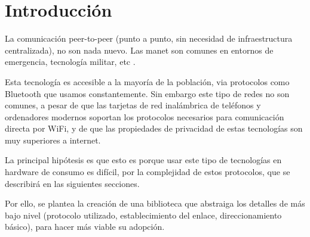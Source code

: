 \chapter{Introducción}

La comunicación peer-to-peer (punto a punto, sin necesidad de infraestructura
centralizada), no son nada nuevo. Las \gls{manet} son comunes en entornos de
emergencia, tecnología militar, etc \cite{wiki:manet_applications}.

Esta tecnología es accesible a la mayoría de la población, via protocolos como
Bluetooth que usamos constantemente. Sin embargo este tipo de redes no son
comunes, a pesar de que las tarjetas de red inalámbrica de teléfonos y
ordenadores modernos soportan los protocolos necesarios para comunicación
directa por WiFi, y de que las propiedades de privacidad de estas tecnologías
son muy superiores a internet.

La principal hipótesis es que esto es porque usar este tipo de tecnologías en
hardware de consumo es difícil, por la complejidad de estos protocolos, que se
describirá en las siguientes secciones.

Por ello, se plantea la creación de una biblioteca que abstraiga los detalles de
más bajo nivel (protocolo utilizado, establecimiento del enlace,
direccionamiento básico), para hacer más viable su adopción.
